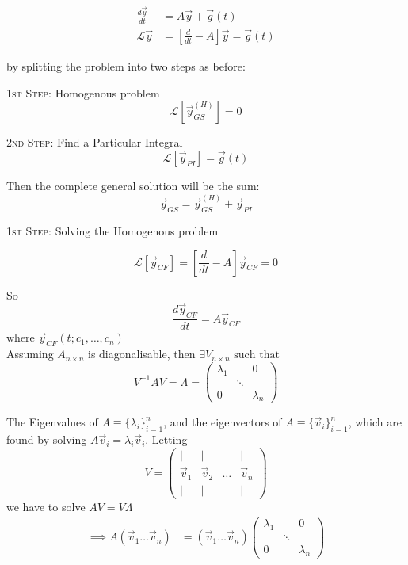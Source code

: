 \documentclass[10pt]{scrartcl}
\begin{document}
\[
\begin{aligned}
  \frac{d\vec{y}}{dt} &= A\vec{y} + \vec{g}(t)\\
  \mathcal{L}\vec{y} &= \left[\frac{d}{dt} - A\right] \vec{y} = \vec{g}(t)
\end{aligned}
\]


by splitting the problem into two steps as before: 

\textsc{1st Step:} Homogenous problem
\[\mathcal{L}[\vec{y}_{GS}^{(H)}] = 0\]

\textsc{2nd Step:} Find a Particular Integral 
\[\mathcal{L}[\vec{y}_{PI}]= \vec{g}(t)\]

Then the complete general solution will be the sum: 
\[\vec{y}_{GS} = \vec{y}_{GS}^{(H)} + \vec{y}_{PI}\]


\textsc{1st Step:} Solving the Homogenous problem

\[\mathcal{L}[\vec{y}_{CF}] = \left[\frac{d}{dt} - A\right]\vec{y}_{CF} = 0\]

So 
\[\frac{d\vec{y}_{CF}}{dt} = A\vec{y}_{CF}\tag{$*$}\]
where $\vec{y}_{CF}(t;c_1,\dots,c_n)$\\


Assuming $A_{n \times n}$ is diagonalisable, then $\exists V_{n \times n} \text{ such that }$
\[V^{-1}AV = \Lambda = \begin{pmatrix}
 \lambda_1 & & 0 \\
 & \ddots & \\
 0 & & \lambda_n	
 \end{pmatrix}\]

The Eigenvalues of $A \equiv \{\lambda_i\}_{i=1}^n$, and the eigenvectors of $A \equiv \{\vec{v}_i\}_{i=1}^n$, which are found by solving $A\vec{v}_i = \lambda_i\vec{v}_i$. Letting \[V = \begin{pmatrix}
 | & | &  & | \\
 \vec{v}_1 & \vec{v}_2 & \dots & \vec{v}_n\\
 | & | &  & | 
 \end{pmatrix}\]
  we have to solve  $AV = V\Lambda$
 \[
\begin{aligned}
  \implies A(\vec{v}_1\dots \vec{v}_n) &= (\vec{v}_1\dots\vec{v}_n)\begin{pmatrix}
 \lambda_1 & & 0 \\
 & \ddots & \\
 0 & & \lambda_n	
 \end{pmatrix}
\end{aligned}
\]
\end{document}
